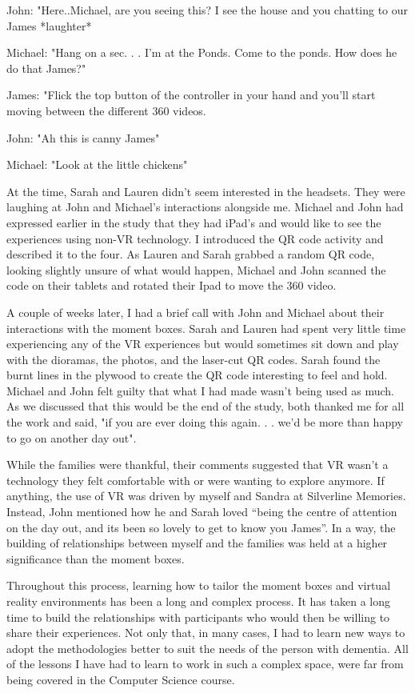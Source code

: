 John: "Here..Michael, are you seeing this? I see the house and you chatting to our James *laughter*

Michael: "Hang on a sec. . . I'm at the Ponds. Come to the ponds. How does he do that James?"

James: "Flick the top button of the controller in your hand and you'll start moving between the different 360 videos.

John: "Ah this is canny James"

Michael: "Look at the little chickens"

At the time, Sarah and Lauren didn't seem interested in the headsets. They were laughing at John and Michael's interactions alongside me. Michael and John had expressed earlier in the study that they had iPad's and would like to see the experiences using non-VR technology. I introduced the QR code activity and described it to the four. As Lauren and Sarah grabbed a random QR code, looking slightly unsure of what would happen, Michael and John scanned the code on their tablets and rotated their Ipad to move the 360 video. 

A couple of weeks later, I had a brief call with John and Michael about their interactions with the moment boxes. Sarah and Lauren had spent very little time experiencing any of the VR experiences but would sometimes sit down and play with the dioramas, the photos, and the laser-cut QR codes. Sarah found the burnt lines in the plywood to create the QR code interesting to feel and hold. Michael and John felt guilty that what I had made wasn't being used as much. As we discussed that this would be the end of the study, both thanked me for all the work and said, "if you are ever doing this again. . . we'd be more than happy to go on another day out".

While the families were thankful, their comments suggested that VR wasn’t a technology they felt comfortable with or were wanting to explore anymore. If anything, the use of VR was driven by myself and Sandra at Silverline Memories. Instead, John mentioned how he and Sarah loved ``being the centre of attention on the day out, and its been so lovely to get to know you James''. In a way, the building of relationships between myself and the families was held at a higher significance than the moment boxes.

Throughout this process, learning how to tailor the moment boxes and virtual reality environments has been a long and complex process. It has taken a long time to build the relationships with participants who would then be willing to share their experiences. Not only that, in many cases, I had to learn new ways to adopt the methodologies better to suit the needs of the person with dementia. All of the lessons I have had to learn to work in such a complex space, were far from being covered in the Computer Science course.

